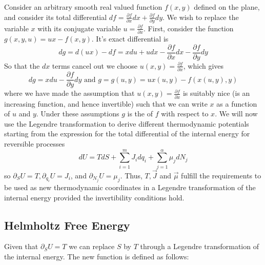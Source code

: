 \documentclass[12pt, a4paper, oneside, openright, titlepage]{book}
\begin{document}
Consider an arbitrary smooth real valued function $f(x,y)$ defined on the plane, and consider its total differential $df = \frac{\partial f}{\partial x}dx + \frac{\partial f}{\partial y}dy$. We wish to replace the variable $x$ with its conjugate variable $u = \frac{\partial f}{\partial x}$. First, consider the function $g(x,y,u) = ux-f(x,y)$. It's exact differential is \begin{equation*}
    dg = d(ux) - df = xdu + udx - \frac{\partial f}{\partial x}dx - \frac{\partial f}{\partial y}dy
\end{equation*}
So that the $dx$ terms cancel out we choose $u(x,y) = \frac{\partial f}{\partial x}$, which gives \begin{equation*}
    dg = xdu - \frac{\partial f}{\partial y}dy \text{  and  } g = g(u,y) = ux(u,y) - f(x(u,y),y)
\end{equation*}
where we have made the assumption that $u(x,y) = \frac{\partial f}{\partial x}$ is suitably nice (is an increasing function, and hence invertible) such that we can write $x$ as a function of $u$ and $y$. Under these assumptions $g$ is the  of $f$ with respect to $x$. We will now use the Legendre transformation to derive different thermodynamic potentials starting from the expression for the total differential of the internal energy for reversible processes \begin{equation*}
    dU = TdS + \sum_{i=1}^mJ_idq_i + \sum_{j=1}^{\alpha}\mu_jdN_j
\end{equation*}
so $\partial_SU = T,\partial_{q_i}U = J_i$, and $\partial_{N_j}U = \mu_j$. Thus, $T,\vec{J}$ and $\vec{\mu}$ fulfill the requirements to be used as new thermodynamic coordinates in a Legendre transformation of the internal energy provided the invertibility conditions hold.


\subsection{Helmholtz Free Energy}

Given that $\partial_SU = T$ we can replace $S$ by $T$ through a Legendre transformation of the internal energy. The new function is defined as follows:
\end{document}
